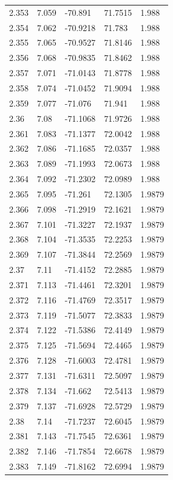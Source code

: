 \begin{tabular}{lllll}
2.353 & 7.059 & -70.891 & 71.7515 & 1.988 \\
2.354 & 7.062 & -70.9218 & 71.783 & 1.988 \\
2.355 & 7.065 & -70.9527 & 71.8146 & 1.988 \\
2.356 & 7.068 & -70.9835 & 71.8462 & 1.988 \\
2.357 & 7.071 & -71.0143 & 71.8778 & 1.988 \\
2.358 & 7.074 & -71.0452 & 71.9094 & 1.988 \\
2.359 & 7.077 & -71.076 & 71.941 & 1.988 \\
2.36 & 7.08 & -71.1068 & 71.9726 & 1.988 \\
2.361 & 7.083 & -71.1377 & 72.0042 & 1.988 \\
2.362 & 7.086 & -71.1685 & 72.0357 & 1.988 \\
2.363 & 7.089 & -71.1993 & 72.0673 & 1.988 \\
2.364 & 7.092 & -71.2302 & 72.0989 & 1.988 \\
2.365 & 7.095 & -71.261 & 72.1305 & 1.9879 \\
2.366 & 7.098 & -71.2919 & 72.1621 & 1.9879 \\
2.367 & 7.101 & -71.3227 & 72.1937 & 1.9879 \\
2.368 & 7.104 & -71.3535 & 72.2253 & 1.9879 \\
2.369 & 7.107 & -71.3844 & 72.2569 & 1.9879 \\
2.37 & 7.11 & -71.4152 & 72.2885 & 1.9879 \\
2.371 & 7.113 & -71.4461 & 72.3201 & 1.9879 \\
2.372 & 7.116 & -71.4769 & 72.3517 & 1.9879 \\
2.373 & 7.119 & -71.5077 & 72.3833 & 1.9879 \\
2.374 & 7.122 & -71.5386 & 72.4149 & 1.9879 \\
2.375 & 7.125 & -71.5694 & 72.4465 & 1.9879 \\
2.376 & 7.128 & -71.6003 & 72.4781 & 1.9879 \\
2.377 & 7.131 & -71.6311 & 72.5097 & 1.9879 \\
2.378 & 7.134 & -71.662 & 72.5413 & 1.9879 \\
2.379 & 7.137 & -71.6928 & 72.5729 & 1.9879 \\
2.38 & 7.14 & -71.7237 & 72.6045 & 1.9879 \\
2.381 & 7.143 & -71.7545 & 72.6361 & 1.9879 \\
2.382 & 7.146 & -71.7854 & 72.6678 & 1.9879 \\
2.383 & 7.149 & -71.8162 & 72.6994 & 1.9879 \\

\end{tabular}
